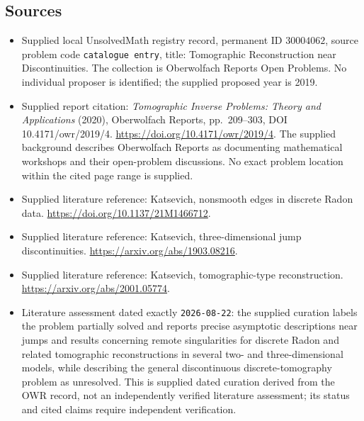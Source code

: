 \documentclass[11pt]{article}
\begin{document}
\subsection{Sources}
\begin{itemize}
\item Supplied local UnsolvedMath registry record, permanent ID \(30004062\), source problem code \texttt{catalogue entry}, title: Tomographic Reconstruction near Discontinuities. The collection is Oberwolfach Reports Open Problems. No individual proposer is identified; the supplied proposed year is 2019.
\item Supplied report citation: \emph{Tomographic Inverse Problems: Theory and Applications} (2020), Oberwolfach Reports, pp.\ 209--303, DOI 10.4171/owr/2019/4. \url{https://doi.org/10.4171/owr/2019/4}. The supplied background describes Oberwolfach Reports as documenting mathematical workshops and their open-problem discussions. No exact problem location within the cited page range is supplied.
\item Supplied literature reference: Katsevich, nonsmooth edges in discrete Radon data. \url{https://doi.org/10.1137/21M1466712}.
\item Supplied literature reference: Katsevich, three-dimensional jump discontinuities. \url{https://arxiv.org/abs/1903.08216}.
\item Supplied literature reference: Katsevich, tomographic-type reconstruction. \url{https://arxiv.org/abs/2001.05774}.
\item Literature assessment dated exactly \texttt{2026-08-22}: the supplied curation labels the problem partially solved and reports precise asymptotic descriptions near jumps and results concerning remote singularities for discrete Radon and related tomographic reconstructions in several two- and three-dimensional models, while describing the general discontinuous discrete-tomography problem as unresolved. This is supplied dated curation derived from the OWR record, not an independently verified literature assessment; its status and cited claims require independent verification.
\end{itemize}
\end{document}

